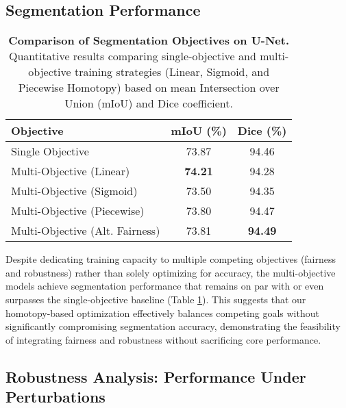 \subsection{Segmentation Performance}
\label{subsec:segmentation_performance}

\begin{table}[ht]
    \centering
    \caption{
        \textbf{Comparison of Segmentation Objectives on U-Net.} 
        Quantitative results comparing single-objective and multi-objective training strategies (Linear, Sigmoid, and Piecewise Homotopy) based on mean Intersection over Union (mIoU) and Dice coefficient.
    }
    \label{tab:segmentation_results_all}
    \begin{adjustbox}{max width=\textwidth}
    \begin{tabular}{@{}lcc@{}}
    \toprule
    \textbf{Objective} & \textbf{mIoU (\%)} & \textbf{Dice (\%)} \\ 
    \midrule
    Single Objective          & 73.87            & 94.46  \\
    Multi-Objective (Linear)  & \textbf{74.21}   & 94.28  \\
    Multi-Objective (Sigmoid) & 73.50            & 94.35  \\
    Multi-Objective (Piecewise) & 73.80         & 94.47  \\
    Multi-Objective (Alt. Fairness) & 73.81    & \textbf{94.49}  \\ 
    \bottomrule
    \end{tabular}
    \end{adjustbox}
\end{table}


Despite dedicating training capacity to multiple competing objectives (fairness and robustness) rather than solely optimizing for accuracy, the multi-objective models achieve segmentation performance that remains on par with or even surpasses the single-objective baseline (Table \ref{tab:segmentation_results_all}). This suggests that our homotopy-based optimization effectively balances competing goals without significantly compromising segmentation accuracy, demonstrating the feasibility of integrating fairness and robustness without sacrificing core performance.

\subsection{Robustness Analysis: Performance Under Perturbations}
\label{subsec:robustness_analysis}

